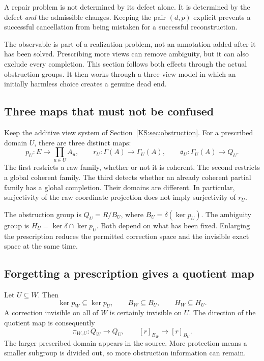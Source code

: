\begin{insight}
A repair problem is not determined by its defect alone. It is determined by the defect \emph{and} the admissible changes. Keeping the pair \((d,p)\) explicit prevents a successful cancellation from being mistaken for a successful reconstruction.
\end{insight}



\label{KS:sec:prescription}
The observable is part of a realization problem, not an annotation added after it has been solved. Prescribing more views can remove ambiguity, but it can also exclude every completion. This section follows both effects through the actual obstruction groups. It then works through a three-view model in which an initially harmless choice creates a genuine dead end.

\subsection{Three maps that must not be confused}
Keep the additive view system of Section~\ref{KS:sec:obstruction}. For a prescribed domain \(U\), there are three distinct maps:
\[
 p_U:E\longrightarrow\prod_{u\in U}A_u,\qquad
 r_U:\Gamma(A)\longrightarrow\Gamma_U(A),\qquad
 \mathfrak o_U:\Gamma_U(A)\longrightarrow Q_U.
\]
The first restricts a raw family, whether or not it is coherent. The second restricts a global coherent family. The third detects whether an already coherent partial family has a global completion. Their domains are different. In particular, surjectivity of the raw coordinate projection does not imply surjectivity of \(r_U\).

The obstruction group is \(Q_U=R/B_U\), where \(B_U=\delta(\ker p_U)\). The ambiguity group is \(H_U=\ker\delta\cap\ker p_U\). Both depend on what has been fixed. Enlarging the prescription reduces the permitted correction space and the invisible exact space at the same time.

\subsection{Forgetting a prescription gives a quotient map}
Let \(U\subseteq W\). Then
\[
 \ker p_W\subseteq\ker p_U,\qquad B_W\subseteq B_U,
 \qquad H_W\subseteq H_U.
\]
A correction invisible on all of \(W\) is certainly invisible on \(U\). The direction of the quotient map is consequently
\[
 \pi_{W,U}:Q_W\longrightarrow Q_U,\qquad
 [r]_{B_W}\longmapsto[r]_{B_U}.
\]
The larger prescribed domain appears in the source. More protection means a smaller subgroup is divided out, so more obstruction information can remain.

